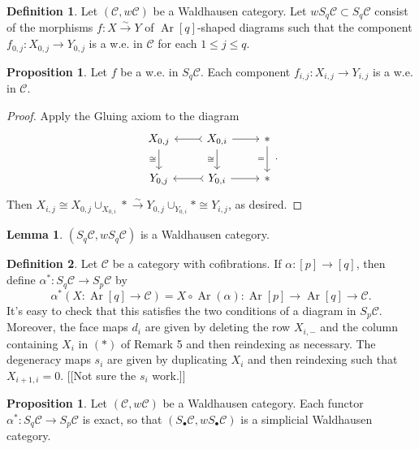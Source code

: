 \documentclass[10pt,letterpaper,cm]{nupset}
\theoremstyle{definition}
\newtheorem{definition}{Definition}
\theoremstyle{theorem}
\newtheorem{lemma}[theorem]{Lemma}
\newtheorem{prop}[theorem]{Proposition}
\theoremstyle{remark}
\newcommand{\1}{\mathbf{1}}
\renewcommand{\c}{\mathscr{C}}
\newcommand{\0}{\vec 0}
\DeclareMathOperator{\Ar}{Ar}
\begin{document}
\begin{definition}
Let $(\c, w \c)$ be a Waldhausen category. Let $w S_q\c \subset S_q \c$ consist of the morphisms $f: X \overset{\sim}{\longrightarrow} Y$ of $\Ar[q]$-shaped diagrams such that the component $f_{0, j} : X_{0, j} \to Y_{0, j}$ is a w.e. in $\c$ for each $1\leq j \leq q$.
\end{definition}

\begin{prop}
Let $f$ be a w.e. in $S_q \c$.  Each component $f_{i, j}: X_{i, j} \to Y_{i, j}$ is a w.e. in $\c$.
\end{prop}
\begin{proof}
Apply the Gluing axiom to the diagram
\[
\begin{tikzcd}
{X_{0, j}} \arrow[d, "\cong"'] & {X_{0, i}} \arrow[l, tail] \arrow[r] \arrow[d, "\cong"'] & \ast \arrow[d, "="'] \\
{Y_{0, j}} & {Y_{0, i}} \arrow[l, tail] \arrow[r] & \ast
\end{tikzcd}.
\] Then $X_{i, j} \cong X_{0, j} \cup_{X_{0, i}} \ast \overset{\sim}{\longrightarrow} Y_{0, j} \cup_{Y_{0, i}} \ast \cong Y_{i, j}$, as desired.
\end{proof}

\begin{lemma}
$(S_q \c, wS_q \c)$ is a Waldhausen category. 
\end{lemma}

\begin{definition}
Let $\c$ be a category with cofibrations. If $\alpha : [p] \to [q]$, then define $\alpha^{\ast} : S_q \c \to S_p \c$ by
$$\alpha^{\ast}(X: \Ar[q] \to \c) = X \circ \Ar(\alpha) : \Ar[p] \to \Ar[q] \to \c.$$
It's easy to check that this satisfies the two conditions of a diagram in $S_p \c$.
Moreover, the face maps $d_i$ are given by deleting the row $X_{i, -}$ and the column containing $X_i$ in $(\ast)$ of Remark 5 and then reindexing as necessary. The degeneracy maps $s_i$ are given by duplicating $X_i$ and then reindexing such that $X_{i+1, i} =0$. {[[Not sure the $s_i$ work.]]} 
\end{definition}

\begin{prop}
Let $(\c, w \c)$ be a Waldhausen category. Each functor $\alpha^{\ast}: S_q \c \to S_p \c$ is exact, so that $(S_{\bullet}\c, wS_{\bullet} \c)$ is a simplicial Waldhausen category.
\end{prop}	
\end{document}

